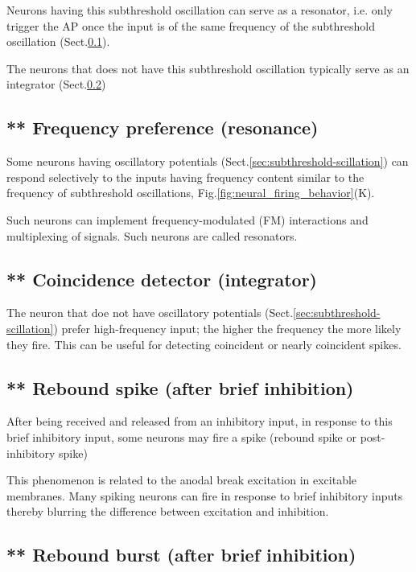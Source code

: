 Neurons having this subthreshold oscillation can serve as a resonator, i.e. only
trigger the AP once the input is of the same frequency of the subthreshold
oscillation (Sect.\ref{sec:frequency-preference}).

The neurons that does not have this subthreshold oscillation typically serve as
an integrator (Sect.\ref{sec:coincidence-detectors})


\subsection{** Frequency preference (resonance)}
\label{sec:frequency-preference}

Some neurons having oscillatory potentials
(Sect.\ref{sec:subthreshold-scillation}) can respond selectively to the inputs
having frequency content similar to the frequency of subthreshold oscillations,
Fig.\ref{fig:neural_firing_behavior}(K).

Such neurons can implement frequency-modulated (FM)
interactions and multiplexing of signals. Such  neurons  are  called
resonators.

\subsection{** Coincidence detector (integrator)}
\label{sec:coincidence-detectors}


The neuron that doe not have oscillatory potentials
(Sect.\ref{sec:subthreshold-scillation}) prefer  high-frequency  input;  the 
higher  the  frequency the more likely they fire. This can be useful for
detecting coincident or nearly coincident spikes.

\subsection{** Rebound spike (after brief inhibition)}
\label{sec:rebound-spike}

After being received and released from an inhibitory input, 
in response to this brief inhibitory input, some neurons may fire a spike
(rebound spike or post-inhibitory spike)

This phenomenon is related to the anodal break excitation in excitable
membranes. Many spiking neurons can fire in response to brief inhibitory inputs
thereby blurring the difference between excitation and inhibition.

\subsection{** Rebound burst (after brief inhibition)}
\label{sec:rebound-burst}

